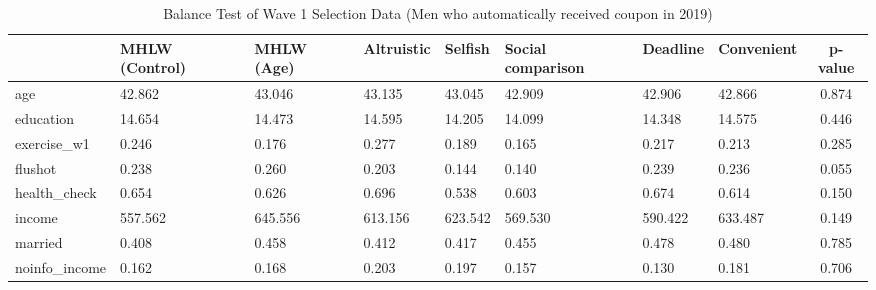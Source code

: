 \begin{table}[!h]

\caption{Balance Test of Wave 1 Selection Data (Men who automatically received coupon in 2019) \label{tab:int-coupon1-balance}}
\centering
\begin{tabular}[t]{l>{\centering\arraybackslash}p{3em}>{\centering\arraybackslash}p{3em}>{\centering\arraybackslash}p{3em}>{\centering\arraybackslash}p{3em}>{\centering\arraybackslash}p{3em}>{\centering\arraybackslash}p{3em}>{\centering\arraybackslash}p{3em}c}
\toprule
  & MHLW (Control) & MHLW (Age) & Altruistic & Selfish & Social comparison & Deadline & Convenient & p-value\\
\midrule
age & \num{42.862} & \num{43.046} & \num{43.135} & \num{43.045} & \num{42.909} & \num{42.906} & \num{42.866} & \num{0.874}\\
education & \num{14.654} & \num{14.473} & \num{14.595} & \num{14.205} & \num{14.099} & \num{14.348} & \num{14.575} & \num{0.446}\\
exercise\_w1 & \num{0.246} & \num{0.176} & \num{0.277} & \num{0.189} & \num{0.165} & \num{0.217} & \num{0.213} & \num{0.285}\\
flushot & \num{0.238} & \num{0.260} & \num{0.203} & \num{0.144} & \num{0.140} & \num{0.239} & \num{0.236} & \num{0.055}\\
health\_check & \num{0.654} & \num{0.626} & \num{0.696} & \num{0.538} & \num{0.603} & \num{0.674} & \num{0.614} & \num{0.150}\\
income & \num{557.562} & \num{645.556} & \num{613.156} & \num{623.542} & \num{569.530} & \num{590.422} & \num{633.487} & \num{0.149}\\
married & \num{0.408} & \num{0.458} & \num{0.412} & \num{0.417} & \num{0.455} & \num{0.478} & \num{0.480} & \num{0.785}\\
noinfo\_income & \num{0.162} & \num{0.168} & \num{0.203} & \num{0.197} & \num{0.157} & \num{0.130} & \num{0.181} & \num{0.706}\\
\bottomrule
\end{tabular}
\end{table}
